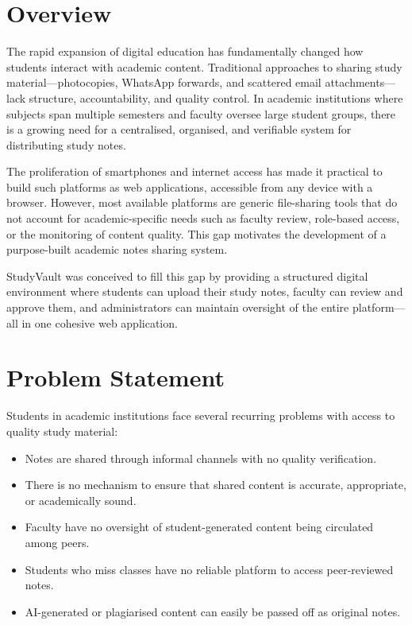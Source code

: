 \documentclass{sgcproject}
\begin{document}
\section{Overview}

The rapid expansion of digital education has fundamentally changed how students interact with academic content. Traditional approaches to sharing study material---photocopies, WhatsApp forwards, and scattered email attachments---lack structure, accountability, and quality control. In academic institutions where subjects span multiple semesters and faculty oversee large student groups, there is a growing need for a centralised, organised, and verifiable system for distributing study notes.

The proliferation of smartphones and internet access has made it practical to build such platforms as web applications, accessible from any device with a browser. However, most available platforms are generic file-sharing tools that do not account for academic-specific needs such as faculty review, role-based access, or the monitoring of content quality. This gap motivates the development of a purpose-built academic notes sharing system.

StudyVault was conceived to fill this gap by providing a structured digital environment where students can upload their study notes, faculty can review and approve them, and administrators can maintain oversight of the entire platform---all in one cohesive web application.

\section{Problem Statement}

Students in academic institutions face several recurring problems with access to quality study material:

\begin{itemize}
    \item Notes are shared through informal channels with no quality verification.
    \item There is no mechanism to ensure that shared content is accurate, appropriate, or academically sound.
    \item Faculty have no oversight of student-generated content being circulated among peers.
    \item Students who miss classes have no reliable platform to access peer-reviewed notes.
    \item AI-generated or plagiarised content can easily be passed off as original notes.
\end{itemize}
\end{document}
